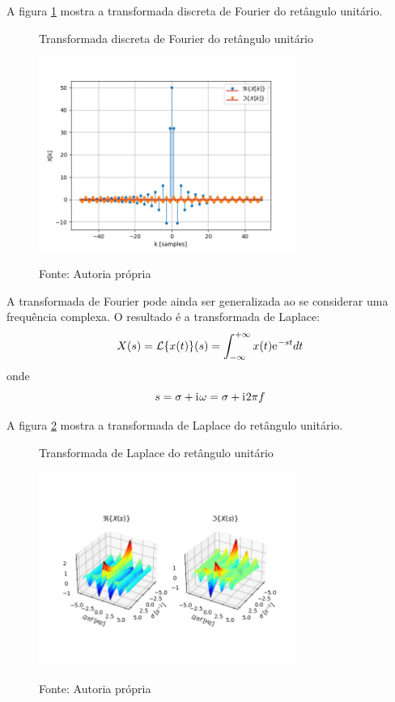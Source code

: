 \documentclass[12pt,a4paper]{report}
\newcommand{\I}{{\mathrm{i}\mkern1mu}}
\newcommand{\euler}{{\mathrm{e}\mkern1mu}}
\begin{document}
  A figura \ref{fig:discrete_fourier_transform} mostra a transformada discreta de Fourier do retângulo unitário.
  \begin{figure}[H]
    \caption{Transformada discreta de Fourier do retângulo unitário}
    \centering
    \includegraphics[width=0.75\textwidth]{discrete_fourier_transform}
    \label{fig:discrete_fourier_transform}
    \caption*{Fonte: Autoria própria}
  \end{figure}

  A transformada de Fourier pode ainda ser generalizada ao se considerar uma frequência complexa. O resultado
  é a transformada de Laplace:
  \begin{equation}
    X(s) = \mathcal{L}\{x(t)\}(s) = \int_{-\infty}^{+\infty} x(t) \euler^{-s t} dt
  \end{equation}
  onde
  \begin{equation}
    s = \sigma + \I \omega = \sigma + \I 2 \pi f
  \end{equation}

  A figura \ref{fig:laplace_transform} mostra a transformada de Laplace do retângulo unitário.
  \begin{figure}[H]
    \caption{Transformada de Laplace do retângulo unitário}
    \centering
    \includegraphics[width=0.75\textwidth]{laplace_transform}
    \label{fig:laplace_transform}
    \caption*{Fonte: Autoria própria}
  \end{figure}
\end{document}
